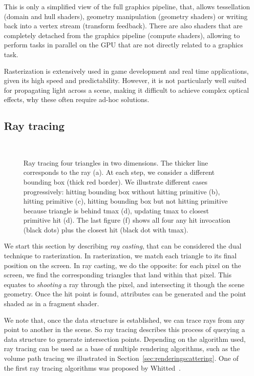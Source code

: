 This is only a simplified view of the full graphics pipeline, that, allows tessellation (domain and hull shaders), geometry manipulation (geometry shaders) or writing back into a vertex stream (transform feedback). There are also shaders that are completely detached from the graphics pipeline (compute shaders), allowing to perform tasks in parallel on the GPU that are not directly related to a graphics task. 

Rasterization is extensively used in game development and real time applications, given its high speed and predictability. However, it is not particularly well suited for propagating light across a scene, making it difficult to achieve complex optical effects, why these often require ad-hoc solutions.

\subsection{Ray tracing}
\label{sec:raytracing}
\begin{figure}
\centering
   \def\svgwidth{\textwidth}
    \\
\caption{Ray tracing four triangles in two dimensions. The thicker line corresponds to the ray (a). At each step, we consider a different bounding box (thick red border). We illustrate different cases progressively: hitting bounding box without hitting primitive (b), hitting primitive (c), hitting bounding box but not hitting primitive because triangle is behind tmax (d), updating tmax to closest primitive hit (d). The last figure (f) shows all four any hit invocation (black dots) plus the closest hit (black dot with tmax).} 
\label{fig:ray_tracing}
\end{figure}

We start this section by describing \emph{ray casting}, that can be considered the dual technique to rasterization. In rasterization, we match each triangle to its final position on the screen. In ray casting, we do the opposite: for each pixel on the screen, we find the corresponding triangles that land within that pixel. This equates to \emph{shooting} a ray through the pixel, and intersecting it though the scene geometry. Once the hit point is found, attributes can be generated and the point shaded as in a fragment shader. 

We note that, once the data structure is established, we can trace rays from any point to another in the scene. So ray tracing describes this process of querying a data structure to generate intersection points. Depending on the algorithm used, ray tracing can be used as a base of multiple rendering algorithms, such as the volume path tracing we illustrated in Section~\ref{sec:renderingscattering}. One of the first ray tracing algorithms was proposed by Whitted~\cite{Whitted1980}.

